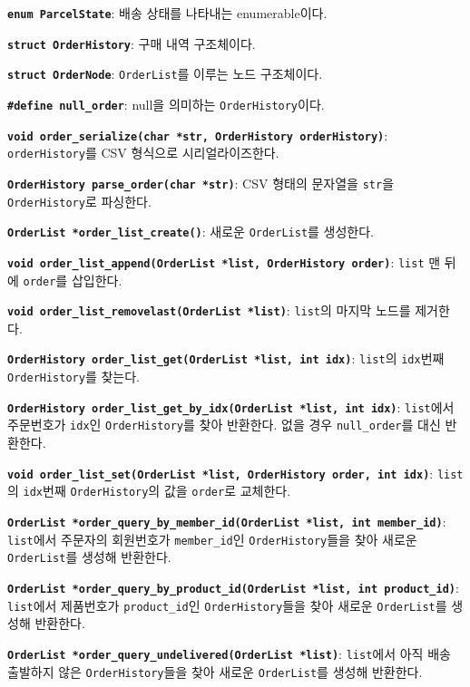 \documentclass[runningheads]{llncs}
\begin{document}
\textbf{\texttt{enum ParcelState}}: 배송 상태를 나타내는 enumerable이다.

\textbf{\texttt{struct OrderHistory}}: 구매 내역 구조체이다.

\textbf{\texttt{struct OrderNode}}: \texttt{OrderList}를 이루는 노드 구조체이다.

\textbf{\texttt{\#define null_order}}: null을 의미하는 \texttt{OrderHistory}이다.

\textbf{\texttt{void order_serialize(char *str, OrderHistory orderHistory)}}: \texttt{orderHistory}를 CSV 형식으로 시리얼라이즈한다.

\textbf{\texttt{OrderHistory parse_order(char *str)}}: CSV 형태의 문자열을 \texttt{str}을 \texttt{OrderHistory}로 파싱한다.

\textbf{\texttt{OrderList *order_list_create()}}: 새로운 \texttt{OrderList}를 생성한다.

\textbf{\texttt{void order_list_append(OrderList *list, OrderHistory order)}}: \texttt{list} 맨 뒤에 \texttt{order}를 삽입한다.

\textbf{\texttt{void order_list_removelast(OrderList *list)}}: \texttt{list}의 마지막 노드를 제거한다.

\textbf{\texttt{OrderHistory order_list_get(OrderList *list, int idx)}}: \texttt{list}의 \texttt{idx}번째 \texttt{OrderHistory}를 찾는다.

\textbf{\texttt{OrderHistory order_list_get_by_idx(OrderList *list, int idx)}}: \texttt{list}에서 주문번호가 \texttt{idx}인 \texttt{OrderHistory}를 찾아 반환한다. 없을 경우 \texttt{null_order}를 대신 반환한다.

\textbf{\texttt{void order_list_set(OrderList *list, OrderHistory order, int idx)}}: \texttt{list}의 \texttt{idx}번째 \texttt{OrderHistory}의 값을 \texttt{order}로 교체한다.

\textbf{\texttt{OrderList *order_query_by_member_id(OrderList *list, int member_id)}}: \texttt{list}에서 주문자의 회원번호가 \texttt{member_id}인 \texttt{OrderHistory}들을 찾아 새로운 \texttt{OrderList}를 생성해 반환한다.

\textbf{\texttt{OrderList *order_query_by_product_id(OrderList *list, int product_id)}}: \texttt{list}에서 제품번호가 \texttt{product_id}인 \texttt{OrderHistory}들을 찾아 새로운 \texttt{OrderList}를 생성해 반환한다.

\textbf{\texttt{OrderList *order_query_undelivered(OrderList *list)}}: \texttt{list}에서 아직 배송 출발하지 않은 \texttt{OrderHistory}들을 찾아 새로운 \texttt{OrderList}를 생성해 반환한다.
\end{document}
